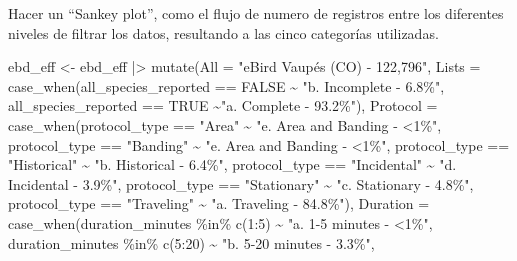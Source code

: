 \documentclass[
]{article}
\newenvironment{Shaded}{\begin{snugshade}}{\end{snugshade}}
\newcommand{\AttributeTok}[1]{\textcolor[rgb]{0.77,0.63,0.00}{#1}}
\newcommand{\ConstantTok}[1]{\textcolor[rgb]{0.00,0.00,0.00}{#1}}
\newcommand{\DecValTok}[1]{\textcolor[rgb]{0.00,0.00,0.81}{#1}}
\newcommand{\FunctionTok}[1]{\textcolor[rgb]{0.00,0.00,0.00}{#1}}
\newcommand{\NormalTok}[1]{#1}
\newcommand{\OtherTok}[1]{\textcolor[rgb]{0.56,0.35,0.01}{#1}}
\newcommand{\SpecialCharTok}[1]{\textcolor[rgb]{0.00,0.00,0.00}{#1}}
\newcommand{\StringTok}[1]{\textcolor[rgb]{0.31,0.60,0.02}{#1}}
\begin{document}
Hacer un ``Sankey plot'', como el flujo de numero de registros entre los
diferentes niveles de filtrar los datos, resultando a las cinco
categorías utilizadas.

\begin{Shaded}
\begin{Highlighting}[]
\NormalTok{ebd\_eff }\OtherTok{\textless{}{-}}\NormalTok{ ebd\_eff }\SpecialCharTok{|\textgreater{}}
  \FunctionTok{mutate}\NormalTok{(}\AttributeTok{All =} \StringTok{"eBird Vaupés (CO) {-} 122,796"}\NormalTok{,}
         \AttributeTok{Lists =} \FunctionTok{case\_when}\NormalTok{(all\_species\_reported }\SpecialCharTok{==} \ConstantTok{FALSE} \SpecialCharTok{\textasciitilde{}} \StringTok{"b. Incomplete {-} 6.8\%"}\NormalTok{,}
\NormalTok{                              all\_species\_reported }\SpecialCharTok{==} \ConstantTok{TRUE} \SpecialCharTok{\textasciitilde{}}\StringTok{"a. Complete {-} 93.2\%"}\NormalTok{),}
         \AttributeTok{Protocol =} \FunctionTok{case\_when}\NormalTok{(protocol\_type }\SpecialCharTok{==} \StringTok{"Area"} \SpecialCharTok{\textasciitilde{}} \StringTok{"e. Area and Banding {-} \textless{}1\%"}\NormalTok{,}
\NormalTok{                              protocol\_type }\SpecialCharTok{==} \StringTok{"Banding"} \SpecialCharTok{\textasciitilde{}} \StringTok{"e. Area and Banding {-} \textless{}1\%"}\NormalTok{,}
\NormalTok{                              protocol\_type }\SpecialCharTok{==} \StringTok{"Historical"} \SpecialCharTok{\textasciitilde{}} \StringTok{"b. Historical {-} 6.4\%"}\NormalTok{,}
\NormalTok{                              protocol\_type }\SpecialCharTok{==} \StringTok{"Incidental"} \SpecialCharTok{\textasciitilde{}} \StringTok{"d. Incidental {-} 3.9\%"}\NormalTok{,}
\NormalTok{                              protocol\_type }\SpecialCharTok{==} \StringTok{"Stationary"} \SpecialCharTok{\textasciitilde{}} \StringTok{"c. Stationary {-} 4.8\%"}\NormalTok{,}
\NormalTok{                              protocol\_type }\SpecialCharTok{==} \StringTok{"Traveling"} \SpecialCharTok{\textasciitilde{}} \StringTok{"a. Traveling {-} 84.8\%"}\NormalTok{),}
         \AttributeTok{Duration =} \FunctionTok{case\_when}\NormalTok{(duration\_minutes }\SpecialCharTok{\%in\%} \FunctionTok{c}\NormalTok{(}\DecValTok{1}\SpecialCharTok{:}\DecValTok{5}\NormalTok{) }\SpecialCharTok{\textasciitilde{}} \StringTok{"a. 1{-}5 minutes {-} \textless{}1\%"}\NormalTok{,}
\NormalTok{                              duration\_minutes }\SpecialCharTok{\%in\%} \FunctionTok{c}\NormalTok{(}\DecValTok{5}\SpecialCharTok{:}\DecValTok{20}\NormalTok{) }\SpecialCharTok{\textasciitilde{}} \StringTok{"b. 5{-}20 minutes {-} 3.3\%"}\NormalTok{,}

\end{Highlighting}
\end{Shaded}
\end{document}
